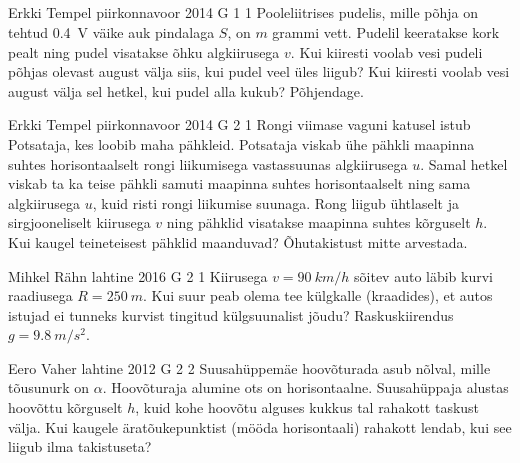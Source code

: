 \documentclass[11pt]{article}
\begin{document}
{        \subsection{\protect{}}

\graphicspath{{../problems/}}

{Erkki Tempel} %
{piirkonnavoor} %
{2014} %
{G 1} %
{1} %
{
\ifStatement
Pooleliitrises pudelis, mille põhja on tehtud \SI{0.4}{V} väike auk pindalaga $S$, on $m$ grammi vett. Pudelil keeratakse kork pealt ning pudel visatakse õhku algkiirusega $v$. Kui kiiresti voolab vesi pudeli põhjas olevast august välja siis, kui pudel veel üles liigub? Kui kiiresti voolab vesi august välja sel hetkel, kui pudel alla kukub? Põhjendage.
\fi
}

{Erkki Tempel} %
{piirkonnavoor} %
{2014} %
{G 2} %
{1} %
{
\ifStatement
Rongi viimase vaguni katusel istub Potsataja, kes loobib maha pähkleid. Potsataja viskab ühe pähkli maapinna suhtes horisontaalselt rongi liikumisega vastassuunas algkiirusega $u$. Samal hetkel viskab ta ka teise pähkli samuti maapinna suhtes horisontaalselt ning sama algkiirusega $u$, kuid risti rongi liikumise suunaga. Rong liigub ühtlaselt ja sirgjooneliselt kiirusega $v$ ning pähklid visatakse maapinna suhtes kõrguselt $h$. Kui kaugel teineteisest pähklid maanduvad? Õhutakistust mitte arvestada.
\fi
}

{Mihkel Rähn} %
{lahtine} %
{2016} %
{G 2} %
{1} %
{
\ifStatement
Kiirusega $v=\SI{90}{km/h}$ sõitev auto läbib kurvi raadiusega $R=\SI{250}{m}$. Kui suur peab olema tee külgkalle (kraadides), et autos istujad ei tunneks kurvist tingitud külgsuunalist jõudu? Raskuskiirendus $g=\SI{9.8}{m/s^{2}}$.
\fi
}

{Eero Vaher} %
{lahtine} %
{2012} %
{G 2} %
{2} %
{
\ifStatement
Suusahüppemäe hoovõturada asub nõlval, mille tõusunurk on $\alpha$. Hoovõturaja alumine
ots on horisontaalne. Suusahüppaja alustas hoovõttu kõrguselt $h$,
kuid kohe hoovõtu alguses kukkus tal rahakott taskust välja. Kui kaugele
äratõukepunktist (mööda
horisontaali) rahakott lendab, kui see liigub ilma takistuseta?
\fi
}

}
\end{document}
